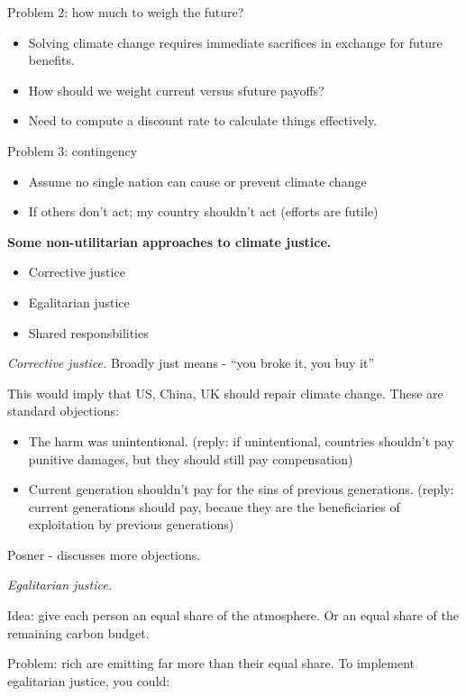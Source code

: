 \documentclass{article}
\begin{document}
  Problem 2: how much to weigh the future?
  \begin{itemize}
    \item Solving climate change requires immediate sacrifices in exchange for future benefits.
    \item How should we weight current versus sfuture payoffs?
    \item Need to compute a discount rate to calculate things effectively.
  \end{itemize}

  Problem 3: contingency
  \begin{itemize}
    \item Assume no single nation can cause or prevent climate change
    \item If others don't act; my country shouldn't act (efforts are futile)
  \end{itemize}

  {\bf Some non-utilitarian approaches to climate justice.}
  \begin{itemize}
    \item Corrective justice
    \item Egalitarian justice
    \item Shared responsbilities
  \end{itemize}

  {\it Corrective justice.} Broadly just means - ``you broke it, you buy it''

  This would imply that US, China, UK should repair climate change.  These are standard objections:

  \begin{itemize}
    \item The harm was unintentional. (reply: if unintentional, countries shouldn't pay punitive damages, but they should still pay compensation)
    \item Current generation shouldn't pay for the sins of previous generations.  (reply: current generations should pay, becaue they are the beneficiaries of exploitation by previous generations)
  \end{itemize}

  Posner - discusses more objections.

  {\it Egalitarian justice.}

  Idea: give each person an equal share of the atmosphere.  Or an equal share of the remaining carbon budget.

  Problem: rich are emitting far more than their equal share.  To implement egalitarian justice, you could:
\end{document}
